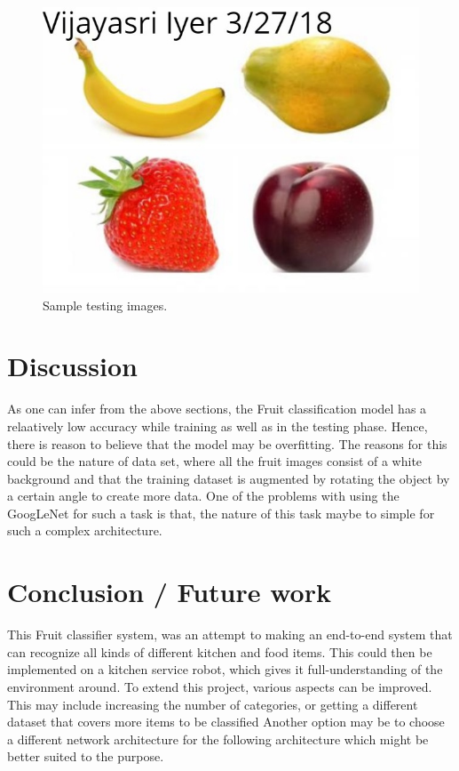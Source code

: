 \documentclass[10pt,journal,compsoc]{IEEEtran}
\begin{document}
\begin{figure}[tbhp]
      \centering
      \includegraphics[width=\linewidth]{own_img.png}
      \caption{Sample testing images.}
      \label{fig:robot1}
\end{figure}

\section{Discussion}
As one can infer from the above sections, the Fruit classification model has a relaatively low accuracy while training as well as in the testing phase. Hence, there is reason to believe that the model may be overfitting. The reasons for this could be the nature of data set, where all the fruit images consist of a white background and that the training dataset is augmented by rotating the object by a certain angle to create more data. One of the problems with using the GoogLeNet for such a task is that, the nature of this task maybe to simple for such a complex architecture. 

\section{Conclusion / Future work}
This Fruit classifier system, was an attempt to making an end-to-end system that can recognize all kinds of different kitchen and food items. This could then be implemented on a kitchen service robot, which gives it full-understanding of the environment around. To extend this project, various aspects can be improved. This may include increasing the number of categories, or getting a different dataset that covers more items to be classified Another option may be to choose a different network architecture for the following architecture which might be better suited to the purpose. 




\end{document}
